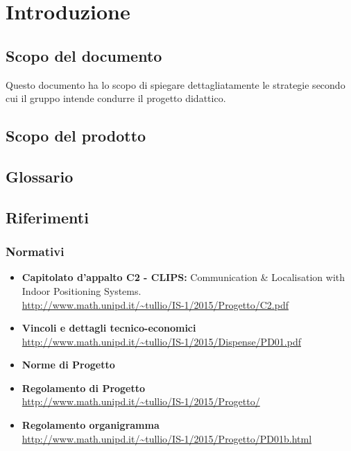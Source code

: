 \section{Introduzione}
	\subsection{Scopo del documento} 
	Questo documento ha lo scopo di spiegare dettagliatamente le strategie secondo cui il gruppo \AUTORE intende condurre il progetto didattico.
	\subsection{Scopo del prodotto}
	\SCOPO
	\subsection{Glossario}
	\GLOSSARIO
	\subsection{Riferimenti}
		\subsubsection{Normativi}
			\begin{itemize}
				\item \textbf{Capitolato d'appalto C2 - CLIPS:} Communication \& Localisation with Indoor Positioning Systems. \\
				\url{http://www.math.unipd.it/~tullio/IS-1/2015/Progetto/C2.pdf}
				\item \textbf{Vincoli e dettagli tecnico-economici} \\
				\url{http://www.math.unipd.it/~tullio/IS-1/2015/Dispense/PD01.pdf}
				\item \textbf{Norme di Progetto} \\ \NPfile
				\item \textbf{Regolamento di Progetto} \\
				\url{http://www.math.unipd.it/~tullio/IS-1/2015/Progetto/}
				\item \textbf{Regolamento organigramma} \\
				\url{http://www.math.unipd.it/~tullio/IS-1/2015/Progetto/PD01b.html}
			\end{itemize}	
			
